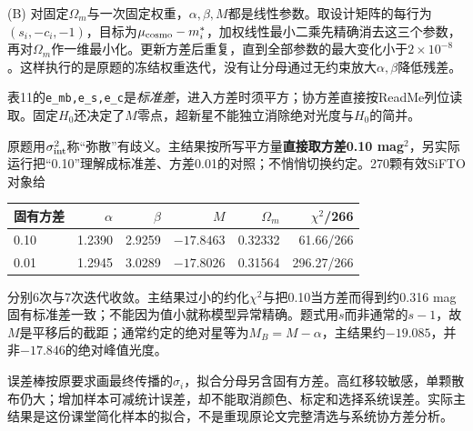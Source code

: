 \begin{solution}
(B) 对固定$\Omega_m$与一次固定权重，$\alpha,\beta,M$都是线性参数。取设计矩阵的每行为$(s_i,-c_i,-1)$，目标为$\mu_{ \rm cosmo}-m_i^*$，加权线性最小二乘先精确消去这三个参数，再对$\Omega_m$作一维最小化。更新方差后重复，直到全部参数的最大变化小于$2\times10^{-8}$。这样执行的是原题的冻结权重迭代，没有让分母通过无约束放大$\alpha,\beta$降低残差。

表11的\texttt{e\_mb,e\_s,e\_c}是\emph{标准差}，进入方差时须平方；协方差直接按ReadMe列位读取。固定$H_0$还决定了$M$零点，超新星不能独立消除绝对光度与$H_0$的简并。

原题用$\sigma_{ \rm int}^2$称“弥散”有歧义。主结果按所写平方量\textbf{直接取方差0.10 mag$^2$}，另实际运行把“0.10”理解成标准差、方差0.01的对照；不悄悄切换约定。270颗有效SiFTO对象给
\begin{center}\begin{tabular}{lrrrrr}\toprule
固有方差&$\alpha$&$\beta$&$M$&$\Omega_m$&$\chi^2$/266\\\midrule
0.10&1.2390&2.9259&$-17.8463$&0.32332&61.66/266\\
0.01&1.2945&3.0289&$-17.8026$&0.31564&296.27/266\\\bottomrule
\end{tabular}\end{center}
分别6次与7次迭代收敛。主结果过小的约化$\chi^2$与把0.10当方差而得到约0.316 mag固有标准差一致；不能因为值小就称模型异常精确。题式用$s$而非通常的$s-1$，故$M$是平移后的截距；通常约定的绝对星等为$M_B=M-\alpha$，主结果约$-19.085$，并非$-17.846$的绝对峰值光度。

\begin{center}\end{center}
误差棒按原要求画最终传播的$\sigma_i$，拟合分母另含固有方差。高红移较敏感，单颗散布仍大；增加样本可减统计误差，却不能取消颜色、标定和选择系统误差。实际主结果是这份课堂简化样本的拟合，不是重现原论文完整清选与系统协方差分析。


\end{solution}
